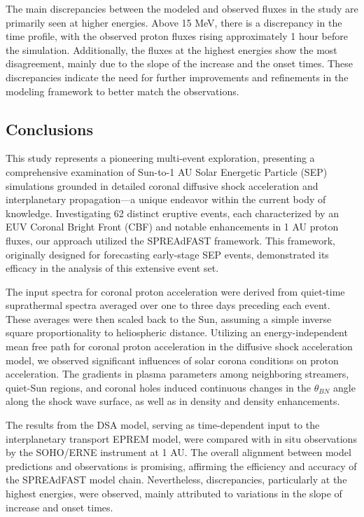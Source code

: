 The main discrepancies between the modeled and observed fluxes in the study are primarily seen at higher energies. Above 15 MeV, there is a discrepancy in the time profile, with the observed proton fluxes rising approximately 1 hour before the simulation. Additionally, the fluxes at the highest energies show the most disagreement, mainly due to the slope of the increase and the onset times. These discrepancies indicate the need for further improvements and refinements in the modeling framework to better match the observations.

\subsection{Conclusions}
This study represents a pioneering multi-event exploration, presenting a comprehensive examination of Sun-to-1 AU Solar Energetic Particle (SEP) simulations grounded in detailed coronal diffusive shock acceleration and interplanetary propagation—a unique endeavor within the current body of knowledge. Investigating 62 distinct eruptive events, each characterized by an EUV Coronal Bright Front (CBF) and notable enhancements in 1 AU proton fluxes, our approach utilized the SPREAdFAST framework. This framework, originally designed for forecasting early-stage SEP events, demonstrated its efficacy in the analysis of this extensive event set.

The input spectra for coronal proton acceleration were derived from quiet-time suprathermal spectra averaged over one to three days preceding each event. These averages were then scaled back to the Sun, assuming a simple inverse square proportionality to heliospheric distance. Utilizing an energy-independent mean free path for coronal proton acceleration in the diffusive shock acceleration model, we observed significant influences of solar corona conditions on proton acceleration. The gradients in plasma parameters among neighboring streamers, quiet-Sun regions, and coronal holes induced continuous changes in the $\theta_{BN}$ angle along the shock wave surface, as well as in density and density enhancements.

The results from the DSA model, serving as time-dependent input to the interplanetary transport EPREM model, were compared with in situ observations by the SOHO/ERNE instrument at 1 AU. The overall alignment between model predictions and observations is promising, affirming the efficiency and accuracy of the SPREAdFAST model chain. Nevertheless, discrepancies, particularly at the highest energies, were observed, mainly attributed to variations in the slope of increase and onset times.

